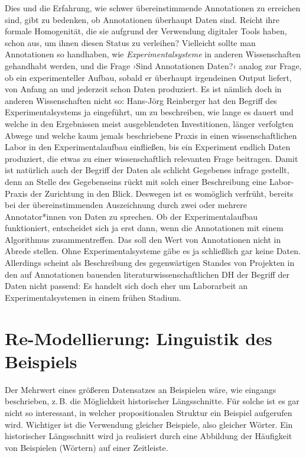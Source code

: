 \documentclass{article}
\begin{document}
Dies und die Erfahrung, wie schwer übereinstimmende Annotationen zu
erreichen sind, gibt zu bedenken, ob Annotationen überhaupt Daten
sind. Reicht ihre formale Homogenität, die sie aufgrund der Verwendung
digitaler Tools haben, schon aus, um ihnen diesen Status zu
verleihen? %
Vielleicht sollte man Annotationen so handhaben, wie
\emph{Experimentalsysteme} in anderen Wissenschaften gehandhabt
werden, und die Frage ›Sind Annotationen Daten?‹ analog zur Frage, ob
ein experimenteller Aufbau, sobald er überhaupt irgendeinen Output
liefert, von Anfang an und jederzeit schon Daten produziert. Es ist
nämlich doch in anderen Wissenschaften nicht so: Hans-Jörg Reinberger
hat den Begriff des Experimentalsystems ja eingeführt, um zu
beschreiben, wie lange es dauert und welche in den Ergebnissen meist
ausgeblendeten Investitionen, länger verfolgten Abwege und welche kaum
jemals beschriebene Praxis in einen wissenschaftlichen Labor in den
Experimentalaufbau einfließen, bis ein Experiment endlich Daten
produziert, die etwas zu einer wissenschaftlich relevanten Frage
beitragen. Damit ist natürlich auch der Begriff der Daten als schlicht
Gegebenes infrage gestellt, denn an Stelle des Gegebenseins rückt mit
solch einer Beschreibung eine Labor-Praxis der Zurichtung in den
Blick. Deswegen ist es womöglich verfrüht, bereits bei der
übereinstimmenden Auszeichnung durch zwei oder mehrere Annotator*innen
von Daten zu sprechen. Ob der Experimentalaufbau funktioniert,
entscheidet sich ja erst dann, wenn die Annotationen mit einem
Algorithmus zusammentreffen. Das soll den Wert von Annotationen nicht
in Abrede stellen. Ohne Experimentalsysteme gäbe es ja schließlich gar
keine Daten. Allerdings scheint als Beschreibung des gegenwärtigen
Standes von Projekten in den auf Annotationen bauenden
literaturwissenschaftlichen DH der Begriff der Daten nicht passend: Es
handelt sich doch eher um Laborarbeit an Experimentalsystemen in einem
frühen Stadium.

\section{Re-Modellierung: Linguistik des Beispiels}

Der Mehrwert eines größeren Datensatzes an Beispielen wäre, wie
eingangs beschrieben, z.\,B. die Möglichkeit historischer
Längsschnitte. Für solche ist es gar nicht so interessant, in welcher
propositionalen Struktur ein Beispiel aufgerufen wird. Wichtiger ist
die Verwendung gleicher Beispiele, also gleicher Wörter. Ein
historischer Längsschnitt wird ja realisiert durch eine Abbildung der
Häufigkeit von Beispielen (Wörtern) auf einer Zeitleiste.
\end{document}
